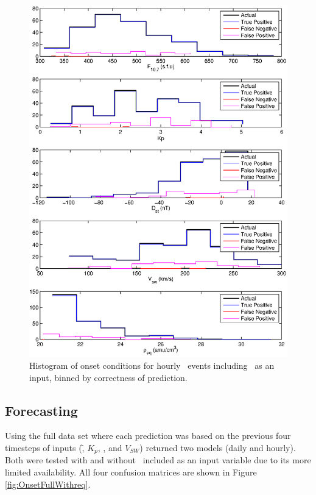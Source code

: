 \begin{figure}[htp!]
	\centering
	\includegraphics[width=1\linewidth]{Figures/CH5/NNBinaryOnset-hourly-withreq-hist.eps}
	\caption{Histogram of onset conditions for hourly \req\ events including \req\ as an input, binned by correctness of prediction.}
	\label{fig:OnsetWithreq-hist}
\end{figure}


\clearpage

\subsection{Forecasting} \label{sec:ForecastResults}

Using the full data set where each prediction was based on the previous four timesteps of inputs (\f, $K_p$, \dst, and $V_{SW}$) returned two models (daily and hourly). Both were tested with and without \req\ included as an input variable due to its more limited availability. All four confusion matrices are shown in Figure \ref{fig:OnsetFullWithreq}.

